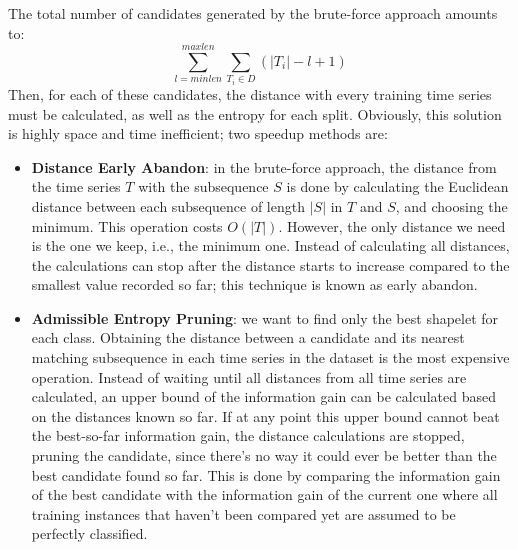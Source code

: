 The total number of candidates generated by the brute-force approach amounts to:
\begin{equation*}
    \sum_{l = \textit{minlen}}^{\textit{maxlen}} \sum_{T_i \in D}(|T_i| - l + 1)
\end{equation*}
Then, for each of these candidates, the distance with every training time series must be calculated, as well as the entropy for each split. Obviously, this solution is highly space and time inefficient; two speedup methods are:
\begin{itemize}
    \item \textbf{Distance Early Abandon}: in the brute-force approach, the distance from the time series $T$ with the subsequence $S$ is done by calculating the Euclidean distance between each subsequence of length $|S|$ in $T$ and $S$, and choosing the minimum. This operation costs $O(|T|)$. However, the only distance we need is the one we keep, i.e., the minimum one. Instead of calculating all distances, the calculations can stop after the distance starts to increase compared to the smallest value recorded so far; this technique is known as early abandon.

    \item \textbf{Admissible Entropy Pruning}: we want to find only the best shapelet for each class. Obtaining the distance between a candidate and its nearest matching subsequence in each time series in the dataset is the most expensive operation. Instead of waiting until all distances from all time series are calculated, an upper bound of the information gain can be calculated based on the distances known so far. If at any point this upper bound cannot beat the best-so-far information gain, the distance calculations are stopped, pruning the candidate, since there's no way it could ever be better than the best candidate found so far. This is done by comparing the information gain of the best candidate with the information gain of the current one where all training instances that haven't been compared yet are assumed to be perfectly classified. 
\end{itemize}



